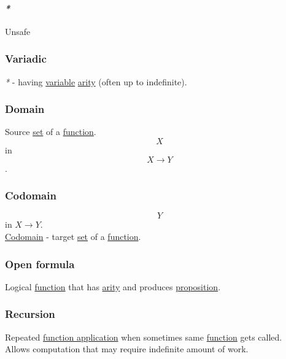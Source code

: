 \documentclass[11pt]{article}
\begin{document}
\paragraph{\emph{*}}
\label{sec:orga708718}

\label{org8ae67d0}Unsafe\\

\subsubsection{\label{orgaade56e}Variadic}
\label{sec:org2a3bcc2}
\emph{*} - having \hyperref[org0b57594]{variable} \hyperref[orgde25f82]{arity} (often up to indefinite).\\

\subsubsection{\label{org494b48a}Domain}
\label{sec:orgcc77900}
Source \hyperref[org1faf06d]{set} of a \hyperref[orge15bc14]{function}.\\
$$ X $$ in $$ X \to Y $$.\\

\subsubsection{\label{org410079d}Codomain}
\label{sec:org9e217d6}
$$ Y $$ in \(X \to Y\).\\
\hyperref[org410079d]{Codomain} - target \hyperref[org1faf06d]{set} of a \hyperref[orge15bc14]{function}.\\

\subsubsection{\label{orga8cb250}Open formula}
\label{sec:orgf27358b}
Logical \hyperref[orge15bc14]{function} that has \hyperref[orgde25f82]{arity} and produces \hyperref[org1e068ed]{proposition}.\\

\subsubsection{\label{orgf98f6ca}Recursion}
\label{sec:org426e2e4}
Repeated \hyperref[org6aac242]{function application} when sometimes same \hyperref[orge15bc14]{function} gets called.\\

Allows computation that may require indefinite amount of work.\\
\end{document}
